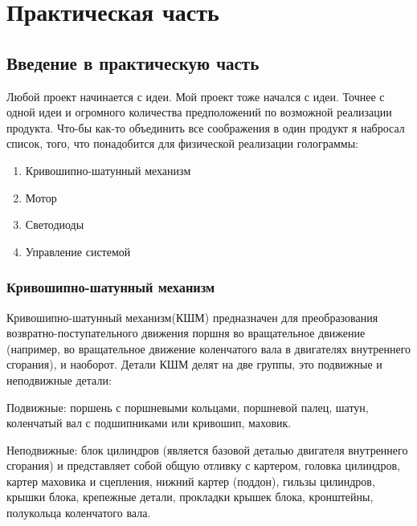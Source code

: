 \documentclass[a4paper, 12pt]{article}
\begin{document}
\newpage

\section{Практическая часть}
\vspace{-7px}
\subsection{Введение в практическую часть}

Любой проект начинается с идеи. Мой проект тоже начался с идеи.
Точнее с одной идеи и огромного количества предположений по возможной реализации продукта.
Что-бы как-то объединить все соображения в один продукт я набросал список, того,
что понадобится для физической реализации голограммы:
\vspace{-7px}
\begin{enumerate}
  \item Кривошипно-шатунный механизм
        \vspace{-10px}
  \item Мотор
        \vspace{-10px}
  \item Светодиоды
        \vspace{-10px}
  \item Управление системой
        \vspace{-10px}
\end{enumerate}
\subsubsection{Кривошипно-шатунный механизм}

Кривошипно-шатунный механизм(КШМ) предназначен для преобразования
возвратно-поступательного движения поршня во вращательное движение
(например, во вращательное движение коленчатого вала в двигателях
внутреннего сгорания), и наоборот. Детали КШМ делят на две
группы, это подвижные и неподвижные детали:

Подвижные: поршень с поршневыми кольцами, поршневой палец,
шатун, коленчатый вал с подшипниками или кривошип, маховик.

Неподвижные: блок цилиндров (является базовой деталью двигателя
внутреннего сгорания) и представляет собой общую отливку с картером,
головка цилиндров, картер маховика и сцепления, нижний картер (поддон),
гильзы цилиндров, крышки блока, крепежные детали, прокладки крышек
блока, кронштейны, полукольца коленчатого вала.
\end{document}
